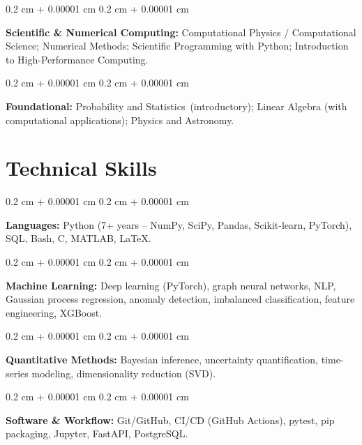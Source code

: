 \documentclass[10pt, letterpaper]{article}
\newenvironment{onecolentry}{
    \begin{adjustwidth}{
        0.2 cm + 0.00001 cm
    }{
        0.2 cm + 0.00001 cm
    }
}{
    \end{adjustwidth}
}
\begin{document}
\vspace{0.2 cm}
 
\begin{onecolentry}
  \textbf{Scientific \& Numerical Computing:} Computational Physics / Computational Science; Numerical Methods; 
  Scientific Programming with Python; Introduction to High-Performance Computing.
\end{onecolentry}
 
\vspace{0.2 cm}
 
\begin{onecolentry}
  \textbf{Foundational:} Probability and Statistics~(introductory); Linear Algebra (with computational applications); 
  Physics and Astronomy.
\end{onecolentry}
 
 
\section{Technical Skills}
 
\begin{onecolentry}
  \textbf{Languages:} Python (7+ years -- NumPy, SciPy, Pandas, Scikit-learn, PyTorch), SQL, Bash, C, MATLAB, \LaTeX.
\end{onecolentry}
 
\vspace{0.2 cm}
 
\begin{onecolentry}
  \textbf{Machine Learning:} Deep learning (PyTorch), graph neural networks, NLP, Gaussian process regression, anomaly detection, imbalanced classification, feature engineering, XGBoost.
\end{onecolentry}
 
\vspace{0.2 cm}
 
\begin{onecolentry}
  \textbf{Quantitative Methods:} Bayesian inference, uncertainty quantification, time-series modeling, dimensionality reduction (SVD).
\end{onecolentry}
 
\vspace{0.2 cm}
 
\begin{onecolentry}
  \textbf{Software \& Workflow:} Git/GitHub, CI/CD (GitHub Actions), pytest, pip packaging, Jupyter, FastAPI, PostgreSQL.
\end{onecolentry}
 
\end{document}
